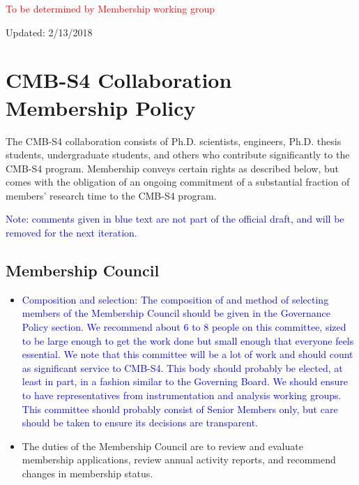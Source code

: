 
\textcolor{red}{To be determined by Membership working group}


Updated:  2/13/2018

\section{CMB-S4 Collaboration Membership Policy}

The CMB-S4 collaboration consists of Ph.D. scientists, engineers, Ph.D. thesis students, undergraduate students, and others who contribute significantly to the CMB-S4 program. Membership conveys certain rights as described below, but comes with the obligation of an ongoing commitment of a substantial fraction of members' research time to the CMB-S4 program.

\vspace{0.2in}
\noindent
\textcolor{blue}{Note: comments given in blue text are not part of the official draft, and will be removed for the next iteration. }

\subsection{Membership Council}
\begin{itemize}

\item 
\textcolor{blue}{Composition and selection:  The composition of and method of selecting members of the Membership Council should be given in the Governance Policy section.  We recommend about 6 to 8 people on this committee, sized to be large enough to get the work done but small enough that everyone feels essential.  We note that this committee will be a lot of work and should count as significant service to CMB-S4.  This body should probably be elected, at least in part, in a fashion similar to the Governing Board.  We should ensure to have representatives from instrumentation and analysis working groups.  This committee should probably consist of Senior Members only, but care should be taken to ensure its decisions are transparent.}

\item The duties of the Membership Council are to review and evaluate membership applications, review annual activity reports, and recommend changes in membership status. 
\end{itemize}

